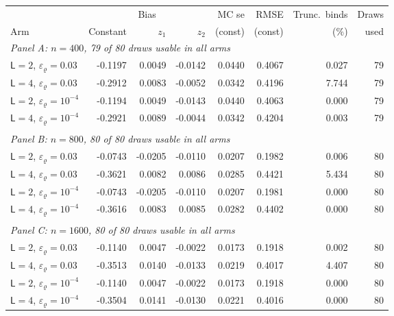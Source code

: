 \begin{tabular}{lrrrrrrr}
\toprule
 & \multicolumn{3}{c}{Bias} & MC se & RMSE & Trunc.\ binds & Draws \\
\cmidrule(lr){2-4}
Arm & Constant & $z_1$ & $z_2$ & (const) & (const) & (\%) & used \\
\midrule
\multicolumn{8}{l}{\textit{Panel A: $n = 400$, 79 of 80 draws usable in all arms}} \\
\midrule
\quad $\mathsf L = 2$, $\varepsilon_\varrho = 0.03$ & -0.1197 & 0.0049 & -0.0142 & 0.0440 & 0.4067 & 0.027 & 79 \\
\quad $\mathsf L = 4$, $\varepsilon_\varrho = 0.03$ & -0.2912 & 0.0083 & -0.0052 & 0.0342 & 0.4196 & 7.744 & 79 \\
\quad $\mathsf L = 2$, $\varepsilon_\varrho = 10^{-4}$ & -0.1194 & 0.0049 & -0.0143 & 0.0440 & 0.4063 & 0.000 & 79 \\
\quad $\mathsf L = 4$, $\varepsilon_\varrho = 10^{-4}$ & -0.2921 & 0.0089 & -0.0044 & 0.0342 & 0.4204 & 0.003 & 79 \\
\\[0.3em]
\multicolumn{8}{l}{\textit{Panel B: $n = 800$, 80 of 80 draws usable in all arms}} \\
\midrule
\quad $\mathsf L = 2$, $\varepsilon_\varrho = 0.03$ & -0.0743 & -0.0205 & -0.0110 & 0.0207 & 0.1982 & 0.006 & 80 \\
\quad $\mathsf L = 4$, $\varepsilon_\varrho = 0.03$ & -0.3621 & 0.0082 & 0.0086 & 0.0285 & 0.4421 & 5.434 & 80 \\
\quad $\mathsf L = 2$, $\varepsilon_\varrho = 10^{-4}$ & -0.0743 & -0.0205 & -0.0110 & 0.0207 & 0.1981 & 0.000 & 80 \\
\quad $\mathsf L = 4$, $\varepsilon_\varrho = 10^{-4}$ & -0.3616 & 0.0083 & 0.0085 & 0.0282 & 0.4402 & 0.000 & 80 \\
\\[0.3em]
\multicolumn{8}{l}{\textit{Panel C: $n = 1600$, 80 of 80 draws usable in all arms}} \\
\midrule
\quad $\mathsf L = 2$, $\varepsilon_\varrho = 0.03$ & -0.1140 & 0.0047 & -0.0022 & 0.0173 & 0.1918 & 0.002 & 80 \\
\quad $\mathsf L = 4$, $\varepsilon_\varrho = 0.03$ & -0.3513 & 0.0140 & -0.0133 & 0.0219 & 0.4017 & 4.407 & 80 \\
\quad $\mathsf L = 2$, $\varepsilon_\varrho = 10^{-4}$ & -0.1140 & 0.0047 & -0.0022 & 0.0173 & 0.1918 & 0.000 & 80 \\
\quad $\mathsf L = 4$, $\varepsilon_\varrho = 10^{-4}$ & -0.3504 & 0.0141 & -0.0130 & 0.0221 & 0.4016 & 0.000 & 80 \\
\bottomrule
\end{tabular}
